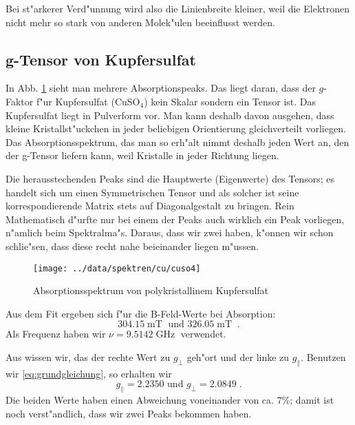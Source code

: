 \documentclass[a4paper,12pt]{article}
\newcommand{\abs}[0]{\bigskip\noindent}
\begin{document}
Bei st"arkerer Verd"unnung wird also die Linienbreite kleiner, weil
die Elektronen nicht mehr so stark von anderen Molek"ulen beeinflusst werden.







\subsection{g-Tensor von Kupfersulfat}
\label{sec:ten_g_tensor}

In Abb. \ref{fig:cuso4} sieht man mehrere Absorptionspeaks. Das liegt
daran, dass der $g$-Faktor f"ur Kupfersulfat (CuSO$_4$) kein Skalar
sondern ein Tensor ist. Das Kupfersulfat liegt in Pulverform vor. Man
kann deshalb davon ausgehen, dass kleine Kristallst"uckchen in jeder
beliebigen Orientierung gleichverteilt vorliegen. Das
Absorptionsspektrum, das man so erh"alt nimmt deshalb jeden Wert an,
den der g-Tensor liefern kann, weil Kristalle in jeder Richtung
liegen.

Die herausstechenden Peaks sind die Hauptwerte (Eigenwerte) des
Tensors; es handelt sich um einen Symmetrischen Tensor und als solcher
ist seine korrespondierende Matrix stets auf Diagonalgestalt zu
bringen. Rein Mathematisch d"urfte nur bei einem der Peaks auch
wirklich ein Peak vorliegen, n"amlich beim Spektralma"s. Daraus, dass
wir zwei haben, k"onnen wir schon schlie"sen, dass diese recht nahe
beieinander liegen m"ussen.


\begin{figure}[!h]
  \centering
  \texttt{[image: ../data/spektren/cu/cuso4]}
  \caption{Absorptionsspektrum von polykristallinem Kupfersulfat}
  \label{fig:cuso4}
\end{figure}



\abs
%
Aus dem Fit ergeben sich f"ur die B-Feld-Werte bei Absorption:
\begin{equation*}
  304.15 \operatorname{mT} \text{ und } 326.05\operatorname{mT} \;.
\end{equation*}
Als Frequenz haben wir $\nu = 9.5142\operatorname{GHz}$ verwendet.

Aus \cite{paper_cu} wissen wir, das
der rechte Wert zu $g_\perp$ geh"ort und der linke zu
$g_\parallel$. Benutzen wir \eqref{eq:grundgleichung}, so erhalten wir
\begin{equation*}
  g_\parallel = 2.2350 \text{ und } g_\perp = 2.0849 \;.
\end{equation*}
Die beiden Werte haben einen Abweichung voneinander von ca. $7\%$;
damit ist noch verst"andlich, dass wir zwei Peaks bekommen haben.
\end{document}
